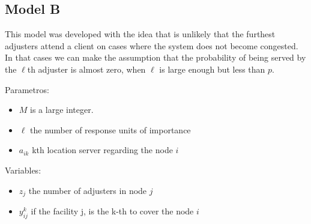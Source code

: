 
\subsection{Model B}
  
\begin{frame}
  This model was developed with the idea that is unlikely that
  the furthest adjusters attend a client on cases where the system does not become congested.
  In that cases we can make the assumption that the probability of being served by the $\ell$th 
  adjuster is almost zero, when $\ell$ is large enough but less than $p$.

  Parametros:
  \begin{itemize}
  \item $M$ is a large integer.
  \item $\ell$ the number of response units of importance
  \item $a_{ik}$ kth location server regarding the node $i$
  \end{itemize}

  Variables:
  \begin{itemize}
  \item $z_j$ the number of adjusters in node $j$
  \item $y_{ij}^k$ if the facility j, is the k-th to cover the node $i$
  \end{itemize}

\end{frame}

